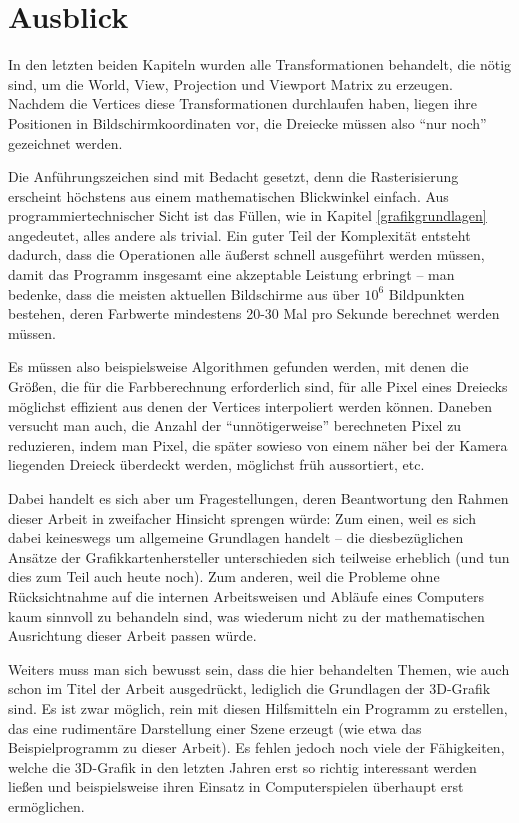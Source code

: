\chapter{Ausblick}

In den letzten beiden Kapiteln wurden alle Transformationen behandelt, die nötig sind, um die World, View, Projection und Viewport Matrix zu erzeugen. Nachdem die Vertices diese Transformationen durchlaufen haben, liegen ihre Positionen in Bildschirmkoordinaten vor, die Dreiecke müssen also \enquote{nur noch} gezeichnet werden.

Die Anführungszeichen sind mit Bedacht gesetzt, denn die Rasterisierung erscheint höchstens aus einem mathematischen Blickwinkel einfach. Aus programmiertechnischer Sicht ist das Füllen, wie in Kapitel \ref{grafikgrundlagen} angedeutet, alles andere als trivial. Ein guter Teil der Komplexität entsteht dadurch, dass die Operationen alle äußerst schnell ausgeführt werden müssen, damit das Programm insgesamt eine akzeptable Leistung erbringt -- man bedenke, dass die meisten aktuellen Bildschirme aus über $10^6$ Bildpunkten bestehen, deren Farbwerte mindestens 20-30 Mal pro Sekunde berechnet werden müssen.

Es müssen also beispielsweise Algorithmen gefunden werden, mit denen die Größen, die für die Farbberechnung erforderlich sind, für alle Pixel eines Dreiecks möglichst effizient aus denen der Vertices interpoliert werden können. Daneben versucht man auch, die Anzahl der \enquote{unnötigerweise} berechneten Pixel zu reduzieren, indem man Pixel, die später sowieso von einem näher bei der Kamera liegenden Dreieck überdeckt werden, möglichst früh aussortiert, etc.

Dabei handelt es sich aber um Fragestellungen, deren Beantwortung den Rahmen dieser Arbeit in zweifacher Hinsicht sprengen würde: Zum einen, weil es sich dabei keineswegs um allgemeine Grundlagen handelt -- die diesbezüglichen Ansätze der Grafikkartenhersteller unterschieden sich teilweise erheblich (und tun dies zum Teil auch heute noch). Zum anderen, weil die Probleme ohne Rücksichtnahme auf die internen Arbeitsweisen und Abläufe eines Computers kaum sinnvoll zu behandeln sind, was wiederum nicht zu der mathematischen Ausrichtung dieser Arbeit passen würde.

Weiters muss man sich bewusst sein, dass die hier behandelten Themen, wie auch schon im Titel der Arbeit ausgedrückt, lediglich die Grundlagen der 3D-Grafik sind. Es ist zwar möglich, rein mit diesen Hilfsmitteln ein Programm zu erstellen, das eine rudimentäre Darstellung einer Szene erzeugt (wie etwa das Beispielprogramm zu dieser Arbeit). Es fehlen jedoch noch viele der Fähigkeiten, welche die 3D-Grafik in den letzten Jahren erst so richtig interessant werden ließen und beispielsweise ihren Einsatz in Computerspielen überhaupt erst ermöglichen.

